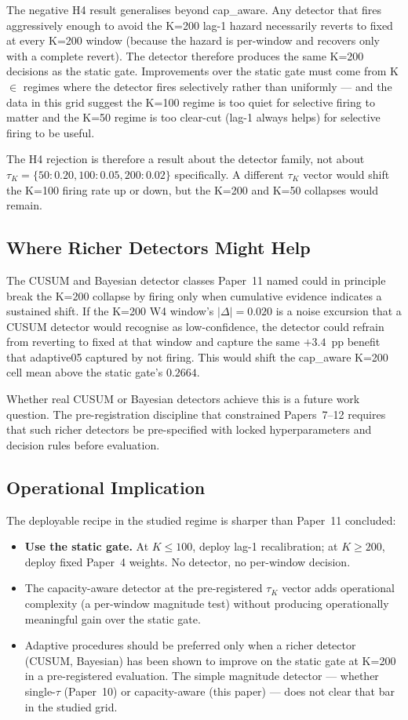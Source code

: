 The negative H4 result generalises beyond cap\_aware. Any detector
that fires aggressively enough to avoid the K=200 lag-1 hazard
necessarily reverts to fixed at every K=200 window (because the
hazard is per-window and recovers only with a complete revert). The
detector therefore produces the same K=200 decisions as the static
gate. Improvements over the static gate must come from K $\in$ regimes
where the detector fires selectively rather than uniformly --- and
the data in this grid suggest the K=100 regime is too quiet for
selective firing to matter and the K=50 regime is too clear-cut
(lag-1 always helps) for selective firing to be useful.

The H4 rejection is therefore a result about the detector family,
not about $\tau_K = \{50: 0.20, 100: 0.05, 200: 0.02\}$ specifically.
A different $\tau_K$ vector would shift the K=100 firing rate up or
down, but the K=200 and K=50 collapses would remain.

\subsection{Where Richer Detectors Might Help}

The CUSUM and Bayesian detector classes Paper~11 named could in
principle break the K=200 collapse by firing only when cumulative
evidence indicates a sustained shift. If the K=200 W4 window's
$|\Delta| = 0.020$ is a noise excursion that a CUSUM detector would
recognise as low-confidence, the detector could refrain from
reverting to fixed at that window and capture the same $+3.4$~pp
benefit that adaptive05 captured by not firing. This would shift
the cap\_aware K=200 cell mean above the static gate's $0.2664$.

Whether real CUSUM or Bayesian detectors achieve this is a future
work question. The pre-registration discipline that constrained
Papers~7--12 requires that such richer detectors be pre-specified
with locked hyperparameters and decision rules before evaluation.

\subsection{Operational Implication}

The deployable recipe in the studied regime is sharper than Paper~11
concluded:
\begin{itemize}
\item \textbf{Use the static gate.} At $K \leq 100$, deploy lag-1
recalibration; at $K \geq 200$, deploy fixed Paper~4 weights. No
detector, no per-window decision.
\item The capacity-aware detector at the pre-registered $\tau_K$
vector adds operational complexity (a per-window magnitude test)
without producing operationally meaningful gain over the static gate.
\item Adaptive procedures should be preferred only when a richer
detector (CUSUM, Bayesian) has been shown to improve on the static
gate at K=200 in a pre-registered evaluation. The simple
magnitude detector --- whether single-$\tau$ (Paper~10) or
capacity-aware (this paper) --- does not clear that bar in the
studied grid.
\end{itemize}
